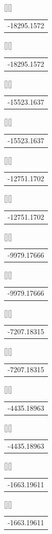 \begin{psfrags}
[][]{\color[rgb]{0,0,0}\setlength{\tabcolsep}{0pt}\begin{tabular}{c}-18295.1572\end{tabular}}%
[][]{\color[rgb]{0,0,0}\setlength{\tabcolsep}{0pt}\begin{tabular}{c}-18295.1572\end{tabular}}%
[][]{\color[rgb]{0,0,0}\setlength{\tabcolsep}{0pt}\begin{tabular}{c}-15523.1637\end{tabular}}%
[][]{\color[rgb]{0,0,0}\setlength{\tabcolsep}{0pt}\begin{tabular}{c}-15523.1637\end{tabular}}%
[][]{\color[rgb]{0,0,0}\setlength{\tabcolsep}{0pt}\begin{tabular}{c}-12751.1702\end{tabular}}%
[][]{\color[rgb]{0,0,0}\setlength{\tabcolsep}{0pt}\begin{tabular}{c}-12751.1702\end{tabular}}%
[][]{\color[rgb]{0,0,0}\setlength{\tabcolsep}{0pt}\begin{tabular}{c}-9979.17666\end{tabular}}%
[][]{\color[rgb]{0,0,0}\setlength{\tabcolsep}{0pt}\begin{tabular}{c}-9979.17666\end{tabular}}%
[][]{\color[rgb]{0,0,0}\setlength{\tabcolsep}{0pt}\begin{tabular}{c}-7207.18315\end{tabular}}%
[][]{\color[rgb]{0,0,0}\setlength{\tabcolsep}{0pt}\begin{tabular}{c}-7207.18315\end{tabular}}%
[][]{\color[rgb]{0,0,0}\setlength{\tabcolsep}{0pt}\begin{tabular}{c}-4435.18963\end{tabular}}%
[][]{\color[rgb]{0,0,0}\setlength{\tabcolsep}{0pt}\begin{tabular}{c}-4435.18963\end{tabular}}%
[][]{\color[rgb]{0,0,0}\setlength{\tabcolsep}{0pt}\begin{tabular}{c}-1663.19611\end{tabular}}%
[][]{\color[rgb]{0,0,0}\setlength{\tabcolsep}{0pt}\begin{tabular}{c}-1663.19611\end{tabular}}%

\end{psfrags}
